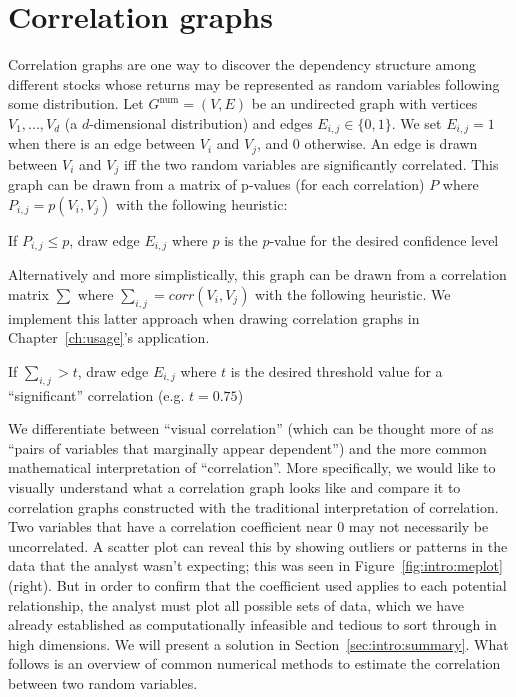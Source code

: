 \section{Correlation graphs}
\label{sec:intro:correlation}

Correlation graphs are one way to discover the dependency structure among
different stocks whose returns may be represented as random variables following
some distribution. Let $G^{\text{num}}=(V,E)$ be an undirected graph with 
vertices
$V_{1},...,V_{d}$ (a $d$-dimensional distribution) and edges
$E_{i,j}\in\{0,1\}$. We set $E_{i,j}=1$ when there is an edge between $V_i$ and
$V_j$, and 0 otherwise. An edge is drawn between $V_i$ and $V_j$ iff the two
random variables are significantly correlated. This graph can be drawn from a 
matrix of p-values (for each correlation) $P$ where $P_{i,j}=p(V_i,V_j)$ 
with the following heuristic:\\

\begin{algorithm}
	If $P_{i,j} \leq p$, draw edge $E_{i,j}$ where $p$ is the $p$-value for the
	desired confidence level
\end{algorithm}

Alternatively and more simplistically, this graph can be drawn from a 
correlation matrix $\sum$ where $\sum_{i,j}=corr(V_i,V_j)$ with the following 
heuristic. We implement this latter approach when drawing correlation graphs in 
Chapter~\ref{ch:usage}'s application.\\

\begin{algorithm}
	If $\sum_{i,j} > t$, draw edge $E_{i,j}$ where $t$ is the desired threshold 
	value for a ``significant'' correlation (e.g. $t = 0.75$)
\end{algorithm}

We differentiate between ``visual correlation'' (which can be thought more of as
``pairs of variables that marginally appear dependent'') and the more common
mathematical interpretation of ``correlation''. More specifically, we would like
to visually understand what a correlation graph looks like and compare it to
correlation graphs constructed with the traditional interpretation of
correlation. Two variables that have a correlation coefficient near 0 may not
necessarily be uncorrelated. A scatter plot can reveal this by showing
outliers or patterns in the data that the analyst wasn't expecting; this was 
seen in Figure~\ref{fig:intro:meplot} (right). But in order to confirm that the 
coefficient used applies to each potential relationship, the analyst must plot 
all possible sets of data, which we have already established as computationally 
infeasible and tedious to sort through in high dimensions. We will present a 
solution in Section~\ref{sec:intro:summary}. What follows is an overview of 
common numerical methods to estimate the correlation between two random 
variables.

